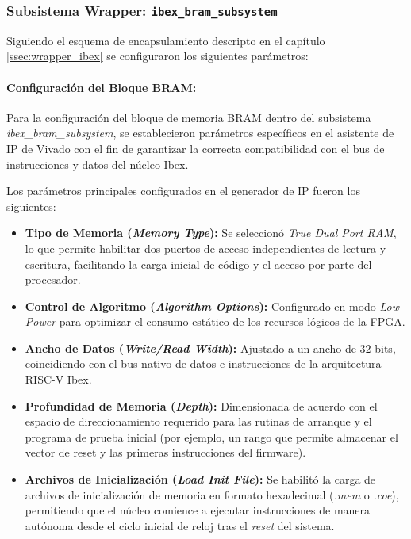 \subsubsection{Subsistema Wrapper: \texttt{ibex\_bram\_subsystem}}
 Siguiendo el esquema de encapsulamiento descripto en el capítulo \ref{ssec:wrapper_ibex} se configuraron los siguientes parámetros:


\paragraph{Configuración del Bloque BRAM:}
Para la configuración del bloque de memoria BRAM dentro del subsistema \textit{ibex\_bram\_subsystem}, se establecieron parámetros específicos en el asistente de IP de Vivado con el fin de garantizar la correcta compatibilidad con el bus de instrucciones y datos del núcleo Ibex. 

Los parámetros principales configurados en el generador de IP fueron los siguientes:

\begin{itemize}
    \item \textbf{Tipo de Memoria (\textit{Memory Type}):} Se seleccionó \textit{True Dual Port RAM}, lo que permite habilitar dos puertos de acceso independientes de lectura y escritura, facilitando la carga inicial de código y el acceso por parte del procesador.
    \item \textbf{Control de Algoritmo (\textit{Algorithm Options}):} Configurado en modo \textit{Low Power} para optimizar el consumo estático de los recursos lógicos de la FPGA.
    \item \textbf{Ancho de Datos (\textit{Write/Read Width}):} Ajustado a un ancho de $32$ bits, coincidiendo con el bus nativo de datos e instrucciones de la arquitectura RISC-V Ibex.
    \item \textbf{Profundidad de Memoria (\textit{Depth}):} Dimensionada de acuerdo con el espacio de direccionamiento requerido para las rutinas de arranque y el programa de prueba inicial (por ejemplo, un rango que permite almacenar el vector de reset y las primeras instrucciones del firmware).
    \item \textbf{Archivos de Inicialización (\textit{Load Init File}):} Se habilitó la carga de archivos de inicialización de memoria en formato hexadecimal (\textit{.mem} o \textit{.coe}), permitiendo que el núcleo comience a ejecutar instrucciones de manera autónoma desde el ciclo inicial de reloj tras el \textit{reset} del sistema.
\end{itemize}

